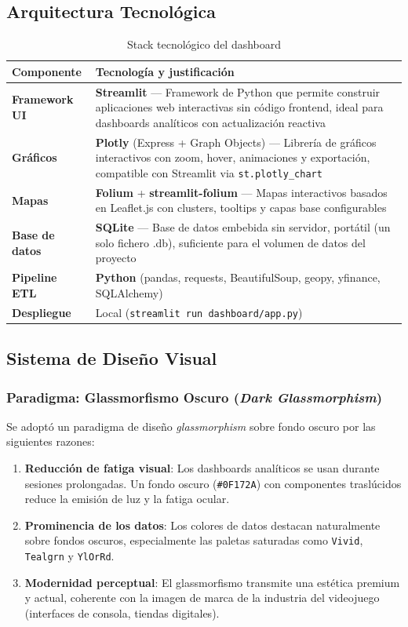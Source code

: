 \documentclass[11pt,a4paper]{article}
\begin{document}
\subsection{Arquitectura Tecnológica}

\begin{table}[H]
\centering
\caption{Stack tecnológico del dashboard}
\begin{tabularx}{\textwidth}{>{\bfseries}l X}
\toprule
Componente & Tecnología y justificación \\
\midrule
Framework UI & \textbf{Streamlit} — Framework de Python que permite construir aplicaciones web interactivas sin código frontend, ideal para dashboards analíticos con actualización reactiva \\
Gráficos & \textbf{Plotly} (Express + Graph Objects) — Librería de gráficos interactivos con zoom, hover, animaciones y exportación, compatible con Streamlit via \texttt{st.plotly\_chart} \\
Mapas & \textbf{Folium} + \textbf{streamlit-folium} — Mapas interactivos basados en Leaflet.js con clusters, tooltips y capas base configurables \\
Base de datos & \textbf{SQLite} — Base de datos embebida sin servidor, portátil (un solo fichero .db), suficiente para el volumen de datos del proyecto \\
Pipeline ETL & \textbf{Python} (pandas, requests, BeautifulSoup, geopy, yfinance, SQLAlchemy) \\
Despliegue & Local (\texttt{streamlit run dashboard/app.py}) \\
\bottomrule
\end{tabularx}
\end{table}

\subsection{Sistema de Diseño Visual}

\subsubsection{Paradigma: Glassmorfismo Oscuro (\textit{Dark Glassmorphism})}

Se adoptó un paradigma de diseño \textit{glassmorphism} sobre fondo oscuro por las siguientes razones:

\begin{enumerate}
  \item \textbf{Reducción de fatiga visual}: Los dashboards analíticos se usan durante sesiones prolongadas. Un fondo oscuro (\texttt{\#0F172A}) con componentes traslúcidos reduce la emisión de luz y la fatiga ocular.
  \item \textbf{Prominencia de los datos}: Los colores de datos destacan naturalmente sobre fondos oscuros, especialmente las paletas saturadas como \texttt{Vivid}, \texttt{Tealgrn} y \texttt{YlOrRd}.
  \item \textbf{Modernidad perceptual}: El glassmorfismo transmite una estética premium y actual, coherente con la imagen de marca de la industria del videojuego (interfaces de consola, tiendas digitales).
\end{enumerate}
\end{document}
